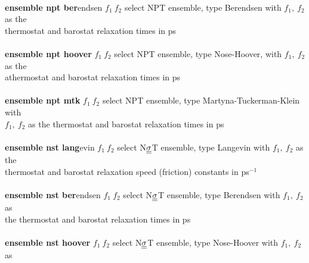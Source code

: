 \begin{tabbing}
\>                                              \> \\
\> {\bf ensemble npt ber}endsen $f_{1}~f_{2}$   \> select NPT ensemble, type Berendsen with $f_{1},~f_{2}$ as the \\
\>                                              \> thermostat and barostat relaxation times in ps \\
\>                                              \> \\
\> {\bf ensemble npt hoover} $f_{1}~f_{2}$      \> select NPT ensemble, type Nose-Hoover, with $f_{1},~f_{2}$ as the \\
\>                                              \> athermostat and barostat relaxation times in ps \\
\>                                              \> \\
\> {\bf ensemble npt mtk} $f_{1}~f_{2}$         \> select NPT ensemble, type Martyna-Tuckerman-Klein with \\
\>                                              \> $f_{1},~f_{2}$ as the thermostat and barostat relaxation times in ps \\
\>                                              \> \\
\> {\bf ensemble nst lang}evin $f_{1}~f_{2}$    \> select N$\mbox{$\underline{\underline{\bf \sigma}}$}$T ensemble, type Langevin with $f_{1},~f_{2}$ as the \\
\>                                              \> thermostat and barostat relaxation speed (friction) constants in ps$^{-1}$ \\
\>                                              \> \\
\> {\bf ensemble nst ber}endsen $f_{1}~f_{2}$   \> select N$\mbox{$\underline{\underline{\bf \sigma}}$}$T ensemble, type Berendsen with $f_{1},~f_{2}$ as \\
\>                                              \> the thermostat and barostat relaxation times in ps \\
\>                                              \> \\
\> {\bf ensemble nst hoover} $f_{1}~f_{2}$      \> select N$\mbox{$\underline{\underline{\bf \sigma}}$}$T ensemble, type Nose-Hoover with $f_{1},~f_{2}$ as \\

\end{tabbing}
